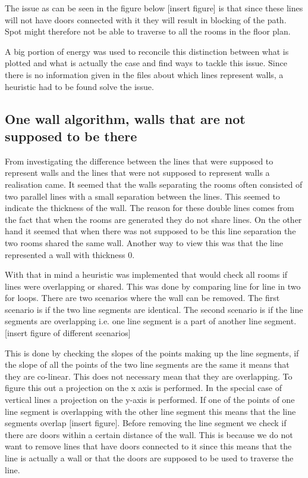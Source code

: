 The issue as can be seen in the figure below [insert figure] is that since these lines will not have doors connected with it they will result in blocking of the path. Spot might therefore not be able to traverse to all the rooms in the floor plan.

A big portion of energy was used to reconcile this distinction between what is plotted and what is actually the case and find ways to tackle this issue. Since there is no information given in the files about which lines represent walls, a heuristic had to be found solve the issue.



\subsection{One wall algorithm, walls that are not supposed to be there}
From investigating the difference between the lines that were supposed to represent walls and the lines that were not supposed to represent walls a realisation came. It seemed that the walls separating the rooms often consisted of two parallel lines with a small separation between the lines. This seemed to indicate the thickness of the wall. The reason for these double lines comes from the fact that when the rooms are generated they do not share lines. On the other hand it seemed that when there was not supposed to be this line separation the two rooms shared the same wall. Another way to view this was that the line represented a wall with thickness 0.

With that in mind a heuristic was implemented that would check all rooms if lines were overlapping or shared. 
This was done by comparing line for line in two for loops. 
There are two scenarios where the wall can be removed. 
The first scenario is if the two line segments are identical.
The second scenario is if the line segments are overlapping i.e. one line segment is a part of another line segment.
[insert figure of different scenarios]

This is done by checking the slopes of the points making up the line segments, if the slope of all the points of the two line segments are the same it means that they are co-linear. This does not necessary mean that they are overlapping. To figure this out a projection on the x axis is performed. In the special case of vertical lines a projection on the y-axis is performed. If  one of the points of one line segment is overlapping with the other line segment this means that the line segments overlap [insert figure]. 
Before removing the line segment we check if there are doors within a certain distance of the wall. This is because we do not want to remove lines that have doors connected to it since this means that the line is actually a wall or that the doors are supposed to be used to traverse the line.

